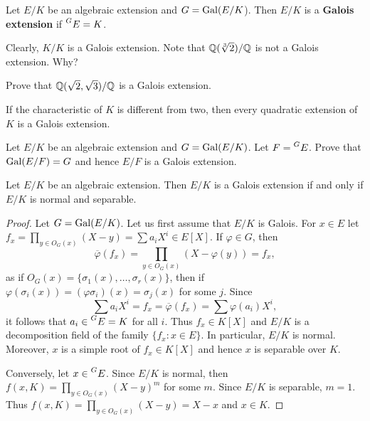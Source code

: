 \begin{definition}
    Let $E/K$ be an algebraic extension and $G=\operatorname{Gal}(E/K$). 
    Then $E/K$ is a \textbf{Galois extension} if $\prescript{G}{}{E}=K$. 
\end{definition}

Clearly, $K/K$ is a Galois extension. 
Note that $\mathbb{Q}(\sqrt[3]{2})/\mathbb{Q}$ is not a Galois extension. Why?

\begin{exercise}
    Prove that $\mathbb{Q}(\sqrt{2},\sqrt{3})/\mathbb{Q}$ is a Galois extension. 
\end{exercise}

\begin{exercise}
If the characteristic of $K$ is different from two, 
then every quadratic extension of $K$ is a Galois extension. 
\end{exercise}

\begin{exercise}
    Let $E/K$ be an algebraic extension and $G=\operatorname{Gal}(E/K)$. Let
    $F=\prescript{G}{}{E}$. Prove that $\operatorname{Gal}(E/F)=G$ and hence $E/F$ is a Galois extension. 
\end{exercise}

\begin{proposition}
\label{pro:normal+separable}
    Let $E/K$ be an algebraic extension. Then $E/K$ is a Galois extension
    if and only if $E/K$ is normal and separable. 
\end{proposition}

\begin{proof}
    Let $G=\operatorname{Gal}(E/K)$. Let us first assume that $E/K$ is Galois. For $x\in E$ let 
    $f_x=\prod_{y\in O_G(x)}(X-y)=\sum a_iX^i\in E[X]$. If $\varphi\in G$, then 
    \[
    \overline{\varphi}(f_x)=\prod_{y\in O_G(x)}(X-\varphi(y))=f_x,
    \]
    as if $O_G(x)=\{\sigma_1(x),\dots,\sigma_r(x)\}$, then if 
    $\varphi(\sigma_i(x))=(\varphi\sigma_i)(x)=\sigma_j(x)$ for some $j$. 
    Since 
    \[
    \sum a_iX^i=f_x=\overline{\varphi}(f_x)=\sum\varphi(a_i)X^i,
    \]
    it follows that $a_i\in\prescript{G}{}{E}=K$ for all $i$. 
    Thus $f_x\in K[X]$
    and $E/K$ is a decomposition field of the family $\{f_x:x\in E\}$. In particular, 
    $E/K$ is normal. Moreover, $x$ is a simple root of $f_x\in K[X]$ and hence
    $x$ is separable over $K$. 

    Conversely, let $x\in \prescript{G}{}{E}$. Since $E/K$ is normal, then 
    $f(x,K)=\prod_{y\in O_G(x)}(X-y)^m$ for some $m$. Since $E/K$ is separable, 
    $m=1$. Thus $f(x,K)=\prod_{y\in O_G(x)}(X-y)=X-x$ and $x\in K$. 
\end{proof}

